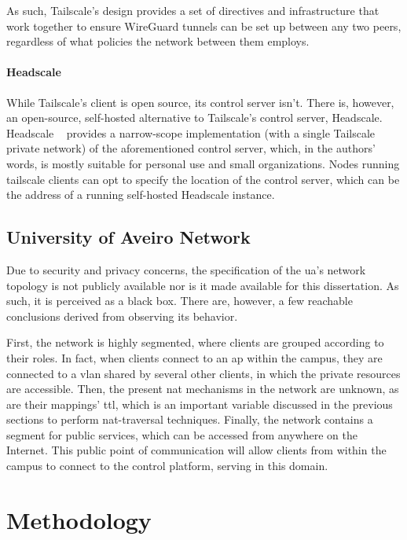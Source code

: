 \documentclass[11pt,twoside,a4paper]{report}
\begin{document}
As such, Tailscale's design provides a set of directives and infrastructure that work together to ensure WireGuard tunnels can be set up between any two peers, regardless of what policies the network between them employs.

\subsubsection{Headscale}
\label{sec:hs}

While Tailscale's client is open source, its control server isn't. There is, however, an open-source, self-hosted alternative to Tailscale's control server, Headscale. Headscale ~\cite{headscale2023online} provides a narrow-scope implementation (with a single Tailscale private network) of the aforementioned control server, which, in the authors' words, is mostly suitable for personal use and small organizations. Nodes running tailscale clients can opt to specify the location of the control server, which can be the address of a running self-hosted Headscale instance.

\section{University of Aveiro Network}
\label{sec:uanet}

Due to security and privacy concerns, the specification of the \ac{ua}'s network topology is not publicly available nor is it made available for this dissertation. As such, it is perceived as a black box. There are, however, a few reachable conclusions derived from observing its behavior.

First, the network is highly segmented, where clients are grouped according to their roles. In fact, when clients connect to an \ac{ap} within the campus, they are connected to a \ac{vlan} shared by several other clients, in which the private resources are accessible. Then, the present \ac{nat} mechanisms in the network are unknown, as are their mappings' \ac{ttl}, which is an important variable discussed in the previous sections to perform \ac{nat}-traversal techniques. Finally, the network contains a segment for public services, which can be accessed from anywhere on the Internet. This public point of communication will allow clients from within the campus to connect to the control platform, serving in this domain.

\chapter{Methodology}
\label{chapter:method}
\end{document}
